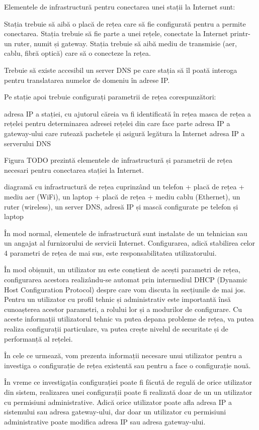 Elementele de infrastructură pentru conectarea unei stații la Internet sunt:

Stația trebuie să aibă o placă de rețea care să fie configurată pentru a permite conectarea.
Stația trebuie să fie parte a unei rețele, conectate la Internet printr-un ruter, numit și gateway.
Stația trebuie să aibă mediu de transmisie (aer, cablu, fibră optică) care să o conecteze la rețea.

Trebuie să existe accesibil un server DNS pe care stația să îl poată interoga pentru translatarea numelor de domeniu în adrese IP.

Pe stație apoi trebuie configurați parametrii de rețea corespunzători:

adresa IP a stației, cu ajutorul căreia va fi identificată în rețea
masca de rețea a rețelei  pentru determinarea adresei rețelei din care face parte
adresa IP a gateway-ului care rutează pachetele și asigură legătura la Internet
adresa IP a serverului DNS

Figura TODO prezintă elementele de infrastructură și parametrii de rețea necesari pentru conectarea stației la Internet.

diagramă cu infrastructură de rețea cuprinzând un telefon + placă de rețea + mediu aer (WiFi), un laptop + placă de rețea + mediu cablu (Ethernet), un ruter (wireless), un server DNS, adresă IP și mască configurate pe telefon și laptop

În mod normal, elementele de infrastructură sunt instalate de un tehnician sau un angajat al furnizorului de servicii Internet. Configurarea, adică stabilirea celor 4 parametri de rețea de mai sus, este responsabilitatea utilizatorului.

În mod obișnuit, un utilizator nu este conștient de acești parametri de rețea, configurarea acestora realizându-se automat prin intermediul DHCP (Dynamic Host Configuration Protocol) despre care vom discuta în secțiunile de mai jos. Pentru un utilizator cu profil tehnic și administrativ este importantă însă cunoașterea acestor parametri, a rolului lor și a modurilor de configurare. Cu aceste informații utilizatorul tehnic va putea depana probleme de rețea, va putea realiza configurații particulare, va putea crește nivelul de securitate și de performanță al rețelei.

În cele ce urmează, vom prezenta informații necesare unui utilizator pentru a investiga o configurație de rețea existentă sau pentru a face o configurație nouă.

În vreme ce investigația configurației poate fi făcută de regulă de orice utilizator din sistem, realizarea unei configurații poate fi realizată doar de un un utilizator cu permisiuni administrative. Adică orice utilizator poate afla adresa IP a sistemului sau adresa gateway-ului, dar doar un utilizator cu permisiuni administrative poate modifica adresa IP sau adresa gateway-ului.

